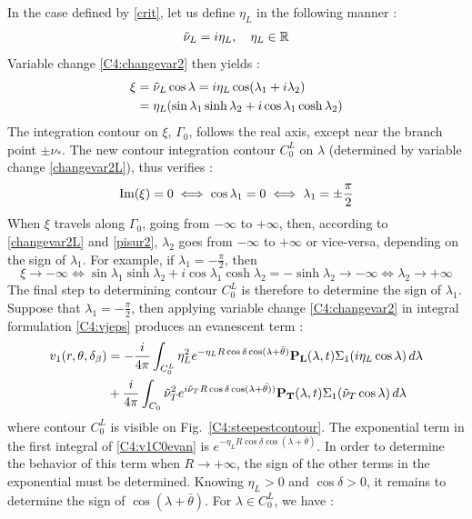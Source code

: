 In the case defined by \eqref{crit}, let us define $\eta_L$ in the following manner :
\begin{equation}
\tilde{\nu}_L=i\eta_L, \quad \eta_L \in \mathbb{R}
\label{defetaL}
\end{equation}
Variable change \eqref{C4:changevar2} then yields :
\begin{equation}
\begin{split}
\xi&=\tilde{\nu}_L\cos\lambda=i\eta_L\cos(\lambda_1+i\lambda_2)\\
&=\eta_L(\sin\lambda_1\sinh\lambda_2+i\cos\lambda_1\cosh\lambda_2)
\end{split}
\label{changevar2L}
\end{equation}
The integration contour on $\xi$, $\Gamma_0$, follows the real axis, except near the branch point $\pm \nu_*$. The new contour integration contour $C_0^L$ on $\lambda$ (determined by variable change \eqref{changevar2L}), thus verifies :
\begin{equation}
\rm Im(\xi)=0 \iff \cos\lambda_1=0 \iff \lambda_1=\pm \frac{\pi}{2}
\label{pisur2}
\end{equation}
When $\xi$ travels along $\Gamma_0$, going from $-\infty$ to $+\infty$, then, according to \eqref{changevar2L} and \eqref{pisur2}, $\lambda_2$ goes from $-\infty$ to $+\infty$ or vice-versa, depending on the sign of $\lambda_1$. For example, if $\lambda_1=-\frac{\pi}{2}$, then 
\begin{equation}
\xi \to -\infty \iff \sin\lambda_1\sinh\lambda_2+i\cos\lambda_1\cosh\lambda_2 = -\sinh\lambda_2 \rightarrow -\infty \iff \lambda_2 \rightarrow +\infty
\end{equation}
The final step to determining contour $C_0^L$ is therefore to determine the sign of $\lambda_1$. Suppose that $\lambda_1=-\frac{\pi}{2}$, then applying variable change \eqref{C4:changevar2} in integral formulation \eqref{C4:vjeps} produces an evanescent term :
\begin{equation}
\begin{split}
v_1(r,\theta,\delta_{\beta})&=-\frac{i}{4\pi} \int_{C_0^L}\eta_L^2 e^{-\eta_L R\cos\delta\cos(\lambda+\bar{\theta})}\mathbf{ P_L}(\lambda,t)\Sigma_1(i\eta_L\cos\lambda) \, d\lambda\\
&+\frac{i}{4\pi} \int_{C_0}\tilde{\nu}_T^2 e^{i\tilde{\nu}_T R\cos\delta\cos(\lambda+\bar{\theta)})}\mathbf{ P_T}(\lambda,t)\Sigma_1(\tilde{\nu}_T\cos\lambda) \, d\lambda
\end{split}
\label{C4:v1C0evan}
\end{equation}
where contour $C_0^L$ is visible on Fig.~\ref{C4:steepestcontour}. The exponential term in the first integral of \eqref{C4:v1C0evan} is $e^{-\eta_L R\cos\delta\cos(\lambda+\bar{\theta})}$. In order to determine the behavior of this term when $R\rightarrow +\infty$, the sign of the other terms in the exponential must be determined. Knowing $\eta_L>0$ and $\cos\delta>0$, it remains to determine the sign of $\cos(\lambda+\bar{\theta})$. For $\lambda \in C_0^L$, we have :
